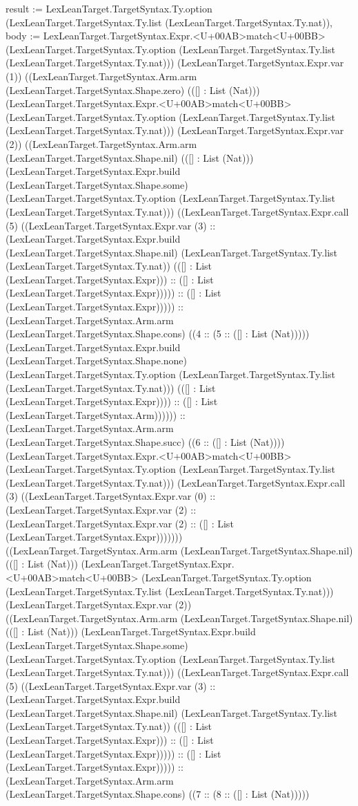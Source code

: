 \documentclass[11pt]{article}
\begin{document}
result := LexLeanTarget.TargetSyntax.Ty.option (LexLeanTarget.TargetSyntax.Ty.list (LexLeanTarget.TargetSyntax.Ty.nat)), body := LexLeanTarget.TargetSyntax.Expr.<U+00AB>match<U+00BB> (LexLeanTarget.TargetSyntax.Ty.option (LexLeanTarget.TargetSyntax.Ty.list (LexLeanTarget.TargetSyntax.Ty.nat))) (LexLeanTarget.TargetSyntax.Expr.var (1)) ((LexLeanTarget.TargetSyntax.Arm.arm (LexLeanTarget.TargetSyntax.Shape.zero) (([] : List (Nat))) (LexLeanTarget.TargetSyntax.Expr.<U+00AB>match<U+00BB> (LexLeanTarget.TargetSyntax.Ty.option (LexLeanTarget.TargetSyntax.Ty.list (LexLeanTarget.TargetSyntax.Ty.nat))) (LexLeanTarget.TargetSyntax.Expr.var (2)) ((LexLeanTarget.TargetSyntax.Arm.arm (LexLeanTarget.TargetSyntax.Shape.nil) (([] : List (Nat))) (LexLeanTarget.TargetSyntax.Expr.build (LexLeanTarget.TargetSyntax.Shape.some) (LexLeanTarget.TargetSyntax.Ty.option (LexLeanTarget.TargetSyntax.Ty.list (LexLeanTarget.TargetSyntax.Ty.nat))) ((LexLeanTarget.TargetSyntax.Expr.call (5) ((LexLeanTarget.TargetSyntax.Expr.var (3) :: (LexLeanTarget.TargetSyntax.Expr.build (LexLeanTarget.TargetSyntax.Shape.nil) (LexLeanTarget.TargetSyntax.Ty.list (LexLeanTarget.TargetSyntax.Ty.nat)) (([] : List (LexLeanTarget.TargetSyntax.Expr))) :: ([] : List (LexLeanTarget.TargetSyntax.Expr))))) :: ([] : List (LexLeanTarget.TargetSyntax.Expr))))) :: (LexLeanTarget.TargetSyntax.Arm.arm (LexLeanTarget.TargetSyntax.Shape.cons) ((4 :: (5 :: ([] : List (Nat))))) (LexLeanTarget.TargetSyntax.Expr.build (LexLeanTarget.TargetSyntax.Shape.none) (LexLeanTarget.TargetSyntax.Ty.option (LexLeanTarget.TargetSyntax.Ty.list (LexLeanTarget.TargetSyntax.Ty.nat))) (([] : List (LexLeanTarget.TargetSyntax.Expr)))) :: ([] : List (LexLeanTarget.TargetSyntax.Arm)))))) :: (LexLeanTarget.TargetSyntax.Arm.arm (LexLeanTarget.TargetSyntax.Shape.succ) ((6 :: ([] : List (Nat)))) (LexLeanTarget.TargetSyntax.Expr.<U+00AB>match<U+00BB> (LexLeanTarget.TargetSyntax.Ty.option (LexLeanTarget.TargetSyntax.Ty.list (LexLeanTarget.TargetSyntax.Ty.nat))) (LexLeanTarget.TargetSyntax.Expr.call (3) ((LexLeanTarget.TargetSyntax.Expr.var (0) :: (LexLeanTarget.TargetSyntax.Expr.var (2) :: (LexLeanTarget.TargetSyntax.Expr.var (2) :: ([] : List (LexLeanTarget.TargetSyntax.Expr))))))) ((LexLeanTarget.TargetSyntax.Arm.arm (LexLeanTarget.TargetSyntax.Shape.nil) (([] : List (Nat))) (LexLeanTarget.TargetSyntax.Expr.<U+00AB>match<U+00BB> (LexLeanTarget.TargetSyntax.Ty.option (LexLeanTarget.TargetSyntax.Ty.list (LexLeanTarget.TargetSyntax.Ty.nat))) (LexLeanTarget.TargetSyntax.Expr.var (2)) ((LexLeanTarget.TargetSyntax.Arm.arm (LexLeanTarget.TargetSyntax.Shape.nil) (([] : List (Nat))) (LexLeanTarget.TargetSyntax.Expr.build (LexLeanTarget.TargetSyntax.Shape.some) (LexLeanTarget.TargetSyntax.Ty.option (LexLeanTarget.TargetSyntax.Ty.list (LexLeanTarget.TargetSyntax.Ty.nat))) ((LexLeanTarget.TargetSyntax.Expr.call (5) ((LexLeanTarget.TargetSyntax.Expr.var (3) :: (LexLeanTarget.TargetSyntax.Expr.build (LexLeanTarget.TargetSyntax.Shape.nil) (LexLeanTarget.TargetSyntax.Ty.list (LexLeanTarget.TargetSyntax.Ty.nat)) (([] : List (LexLeanTarget.TargetSyntax.Expr))) :: ([] : List (LexLeanTarget.TargetSyntax.Expr))))) :: ([] : List (LexLeanTarget.TargetSyntax.Expr))))) :: (LexLeanTarget.TargetSyntax.Arm.arm (LexLeanTarget.TargetSyntax.Shape.cons) ((7 :: (8 :: ([] : List (Nat))))) 
\end{document}
